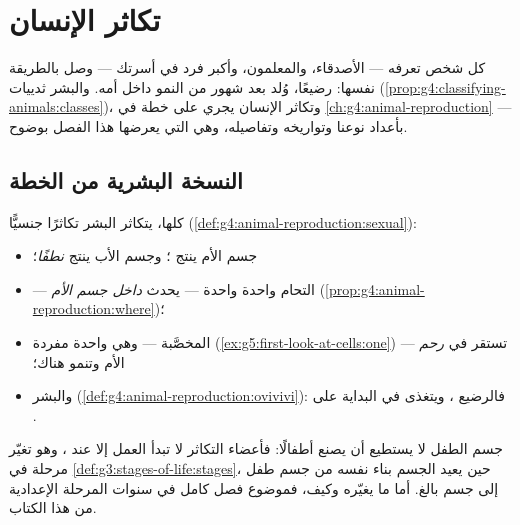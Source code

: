\chapter{تكاثر الإنسان}\label{ch:g5:human-reproduction}

كل شخص تعرفه --- الأصدقاء، والمعلمون، وأكبر فرد في أسرتك --- وصل
بالطريقة نفسها: رضيعًا، وُلد بعد شهور من النمو داخل أمه. والبشر
ثدييات (\cref{prop:g4:classifying-animals:classes})، وتكاثر
الإنسان يجري على خطة  في
\cref{ch:g4:animal-reproduction} --- بأعداد نوعنا وتواريخه
وتفاصيله، وهي التي يعرضها هذا الفصل بوضوح.

\section{النسخة البشرية من الخطة}

\begin{proposition}\label{prop:g5:human-reproduction:plan}
 كلها، يتكاثر البشر تكاثرًا جنسيًّا
(\cref{def:g4:animal-reproduction:sexual}):
\begin{itemize}
  \item جسم الأم ينتج \emph{}؛ وجسم الأب ينتج
        \emph{نطفًا}؛
  \item {} --- التحام  واحدة  واحدة --- يحدث
        \emph{داخل جسم الأم}
        (\cref{prop:g4:animal-reproduction:where})؛
  \item {} المخصَّبة --- وهي  واحدة مفردة
        (\cref{ex:g5:first-look-at-cells:one}) --- تستقر في
        \emph{رحم} الأم وتنمو هناك؛
  \item والبشر 
        (\cref{def:g4:animal-reproduction:ovivivi}): فالرضيع
        ، ويتغذى في البداية على .
\end{itemize}
\end{proposition}
\admitted

\begin{remark}\label{rem:g5:human-reproduction:adults}
جسم الطفل لا يستطيع أن يصنع أطفالًا: فأعضاء التكاثر لا تبدأ العمل
إلا عند \emph{}، وهو تغيّر مرحلة  في
\cref{def:g3:stages-of-life:stages}، حين يعيد الجسم بناء نفسه من
جسم طفل إلى جسم بالغ. أما ما يغيّره  وكيف، فموضوع فصل كامل
في سنوات المرحلة الإعدادية من هذا الكتاب.
\end{remark}

